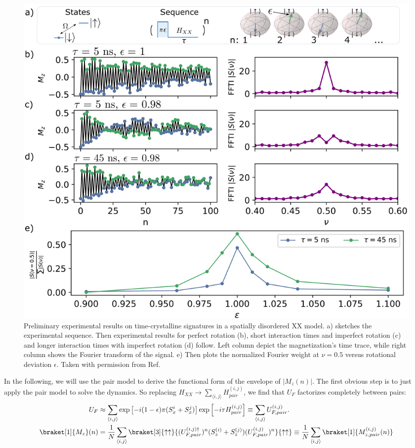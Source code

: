 \begin{figure}[htb]
	\centering
	\includegraphics[width=\textwidth]{gfx/preliminary-timecrystal.png}
	\caption{Preliminary experimental results on time-crystalline signatures in a spatially disordered XX model. a) sketches the experimental sequence. Then experimental results for perfect rotation (b), short interaction times and imperfect rotation (c) and longer interaction times with imperfect rotation (d) follow. Left column depict the magnetization's time trace, while right column shows the Fourier transform of the signal. e) Then plots the normalized Fourier weight at $\nu=0.5$ versus rotational deviation $\epsilon$. Taken with permission from Ref.~\cite{geierShapingHamiltonianManybody}}
	\label{fig:rydberg-timecrystal-experiment}
\end{figure}

In the following, we will use the pair model to derive the functional form of the envelope of $|M_z(n)|$. The first obvious step is to just apply the pair model to solve the dynamics. So replacing $H_{XX}\rightarrow \sum_{\langle i,j\rangle}H_{pair}^{(i,j)}$, we find that $U_{F}$ factorizes completely between pairs:
\begin{align}
	U_F &\approx \sum_{\langle i,j\rangle} \exp\left[-i(1-\epsilon)\pi (S_x^i+S_x^j)\right] \exp\left[-i\tau H_{pair}^{(i,j)} \right] \equiv \sum_{\langle i,j\rangle} U_{F,pair}^{(i,j)}.\\
	\braket[1]{M_z}(n) &= \frac{1}{N}\sum_{\langle i,j\rangle} \braket[3]{\uparrow\uparrow}{(U_{F,pair}^{(i,j)\dagger})^n (S_z^{(i)}+S_z^{(j)})(U_{F,pair}^{(i,j)})^n}{\uparrow\uparrow} \equiv \frac{1}{N}\sum_{\langle i,j\rangle} \braket[1]{M^{(i,j)}_{z,pair}(n)}
\end{align}

